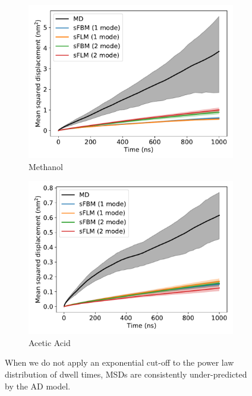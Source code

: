 \documentclass{article}
\begin{document}
\begin{figure}[h]
\begin{subfigure}{0.45\textwidth}
  \includegraphics[width=\textwidth]{bothmode_msd_comparison_MET.pdf}
  \caption{Methanol}\label{fig:bothmode_msd_comparison_MET}
  \end{subfigure}
  \begin{subfigure}{0.45\textwidth}
  \includegraphics[width=\textwidth]{bothmode_msd_comparison_ACH.pdf}
  \caption{Acetic Acid}\label{fig:bothmode_msd_comparison_ACH}
  \end{subfigure}
  \caption{When we do not apply an exponential cut-off to the power law
  distribution of dwell times,  MSDs are consistently under-predicted by the
  AD model.
  }\label{fig:anomalous_msds_bothmode}
  \end{figure}
  
\end{document}
